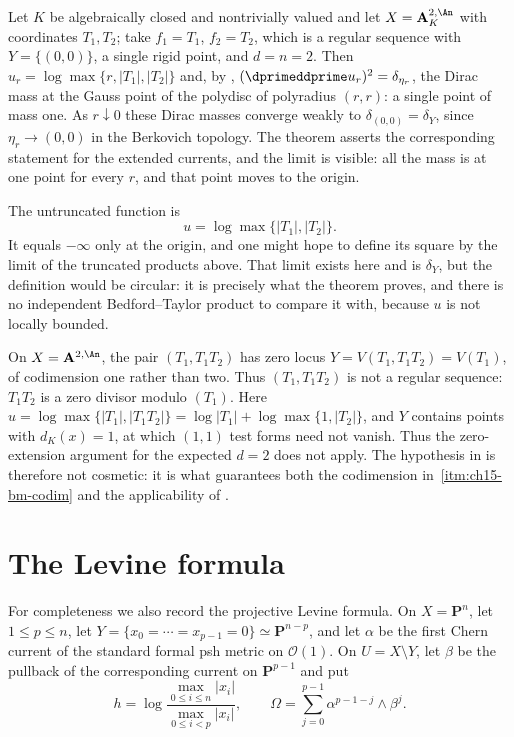 \begin{example}[$d=n$: a finite fibre on the affine plane]
\label{ex:ch15-bm-dn}
Let $K$ be algebraically closed and nontrivially valued and let
$X=\mathbf A^{2,\An}_K$ with coordinates $T_1,T_2$; take $f_1=T_1$,
$f_2=T_2$, which is a regular sequence with $Y=\{(0,0)\}$, a single rigid
point, and $d=n=2$.  Then
$u_r=\log\max\{r,|T_1|,|T_2|\}$ and, by ,
$(\dprimeddprime u_r)^2=\delta_{\eta_r}$, the Dirac mass at the Gauss point
of the polydisc of polyradius $(r,r)$: a single point of mass one.  As
$r\downarrow0$ these Dirac masses converge weakly to
$\delta_{(0,0)}=\delta_Y$, since $\eta_r\to(0,0)$ in the Berkovich topology.
The theorem asserts the corresponding statement for the extended currents,
and the limit is visible: all the mass is at one point for every $r$, and
that point moves to the origin.

The untruncated function is
\[
 u=\log\max\{|T_1|,|T_2|\}.
\]
It equals $-\infty$ only at the origin, and one might
hope to define its square by the limit of the truncated products above.
That limit exists here and is $\delta_Y$, but the definition would be
circular: it is precisely what the theorem proves, and there is no
independent Bedford--Taylor product to compare it with, because $u$ is not
locally bounded.
\end{example}

\begin{example}
\label{ex:ch15-bm-notregular}
On $X=\mathbf A^{2,\An}$, the pair $(T_1,T_1T_2)$ has zero locus
$Y=V(T_1,T_1T_2)=V(T_1)$, of codimension one rather than two.  Thus $(T_1,T_1T_2)$ is not
a regular sequence: $T_1T_2$ is a zero divisor modulo $(T_1)$.  Here
$u=\log\max\{|T_1|,|T_1T_2|\}=\log|T_1|+\log\max\{1,|T_2|\}$, and
$Y$ contains points with $d_K(x)=1$, at which $(1,1)$ test forms need not
vanish.  Thus the zero-extension argument for the expected $d=2$ does not
apply.  The
hypothesis in  is therefore not
cosmetic: it is what guarantees both the codimension in
\,\cref{itm:ch15-bm-codim} and the applicability of
.
\end{example}

\section{The Levine formula}
\label{sec:ch15-levine}

For completeness we also record the projective Levine formula.  On
$X=\mathbf P^n$, let $1\leq p\leq n$, let
$Y=\{x_0=\cdots=x_{p-1}=0\}\simeq\mathbf P^{n-p}$, and let
$\alpha$ be the first Chern current of the standard formal psh metric on
$\mathcal O(1)$.  On $U=X\setminus Y$, let $\beta$ be the pullback of the
corresponding current on $\mathbf P^{p-1}$ and put
\[
 h=\log\frac{\max_{0\leq i\leq n}|x_i|}
                   {\max_{0\leq i<p}|x_i|},
 \qquad
 \Omega=\sum_{j=0}^{p-1}\alpha^{p-1-j}\wedge\beta^j.
\]

